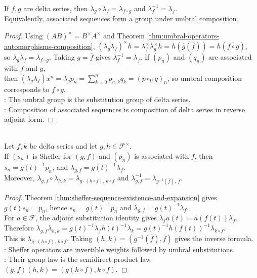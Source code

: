 \begin{theorem} \label{thm:umbral-operators-group-law} \\
If $f,g$ are delta series, then $\lambda_g\circ\lambda_f=\lambda_{f\circ g}$ and $\lambda_f^{-1}=\lambda_{\overline f}$.\\
Equivalently, associated sequences form a group under umbral composition.
\begin{proof} Using $(AB)^\times=B^\times A^\times$ and Theorem \ref{thm:umbral-operators-automorphisms-composition}, $(\lambda_g\lambda_f)^\times h =\lambda_f^\times\lambda_g^\times h =h(\overline g(\overline f)) =h(\overline{f\circ g})$,\\
so $\lambda_g\lambda_f=\lambda_{f\circ g}$. Taking $g=\overline f$ gives $\lambda_f^{-1}=\lambda_{\overline f}$. If $(p_n)$ and $(q_n)$ are associated with $f$ and $g$,\\
then $(\lambda_g\lambda_f)x^n=\lambda_g p_n =\sum\limits_{k=0}^{n}p_{n,k}q_k=(p\circ_U q)_n$, so umbral composition corresponds to $f\circ g$.\\
: The umbral group is the substitution group of delta series.\\
: Composition of associated sequences is composition of delta series in reverse adjoint form.
\end{proof}
\end{theorem}

\begin{proposition} \label{prop:sheffer-operators-group-law} \\
Let $f,k$ be delta series and let $g,h\in\mathscr{F}^{\times}$.\\
If $(s_n)$ is Sheffer for $(g,f)$ and $(p_n)$ is associated with $f$, then $s_n=g(t)^{-1}p_n$, and $\lambda_{g,f}=g(t)^{-1}\lambda_f$.\\
Moreover, $\lambda_{g,f}\circ\lambda_{h,k} =\lambda_{g\cdot(h\circ f),\,k\circ f}$ and $\lambda_{g,f}^{-1}=\lambda_{g^{-1}(\overline f),\,\overline f}$.
\begin{proof}
Theorem \ref{thm:sheffer-sequence-existence-and-expansion} gives $g(t)s_n=p_n$, hence $s_n=g(t)^{-1}p_n$ and $\lambda_{g,f}=g(t)^{-1}\lambda_f$.\\
For $a\in\mathscr{F}$, the adjoint substitution identity gives $\lambda_f a(t)=a(f(t))\lambda_f$.\\
Therefore $\lambda_{g,f}\lambda_{h,k} =g(t)^{-1}\lambda_fh(t)^{-1}\lambda_k =g(t)^{-1}h(f(t))^{-1}\lambda_{k\circ f}$.\\
This is $\lambda_{g\cdot(h\circ f),\,k\circ f}$. Taking $(h,k)=(g^{-1}(\overline f),\overline f)$ gives the inverse formula.\\
: Sheffer operators are invertible weights followed by umbral substitutions.\\
: Their group law is the semidirect product law
$(g,f)(h,k)=(g(h\circ f),k\circ f)$.
\end{proof}
\end{proposition}

